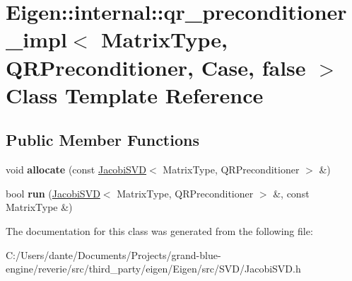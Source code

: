 \hypertarget{class_eigen_1_1internal_1_1qr__preconditioner__impl_3_01_matrix_type_00_01_q_r_preconditioner_00_01_case_00_01false_01_4}{}\section{Eigen\+::internal\+::qr\+\_\+preconditioner\+\_\+impl$<$ Matrix\+Type, Q\+R\+Preconditioner, Case, false $>$ Class Template Reference}
\label{class_eigen_1_1internal_1_1qr__preconditioner__impl_3_01_matrix_type_00_01_q_r_preconditioner_00_01_case_00_01false_01_4}
\subsection*{Public Member Functions}
\begin{DoxyCompactItemize}
\item 
\mbox{\label{class_eigen_1_1internal_1_1qr__preconditioner__impl_3_01_matrix_type_00_01_q_r_preconditioner_00_01_case_00_01false_01_4_a01b0ec87576066bf204beaadddf9a8a0}} 
void {\bfseries allocate} (const \mbox{\hyperlink{class_eigen_1_1_jacobi_s_v_d}{Jacobi\+S\+VD}}$<$ Matrix\+Type, Q\+R\+Preconditioner $>$ \&)
\item 
\mbox{\label{class_eigen_1_1internal_1_1qr__preconditioner__impl_3_01_matrix_type_00_01_q_r_preconditioner_00_01_case_00_01false_01_4_abeec41257bdf659db9940e51544c4073}} 
bool {\bfseries run} (\mbox{\hyperlink{class_eigen_1_1_jacobi_s_v_d}{Jacobi\+S\+VD}}$<$ Matrix\+Type, Q\+R\+Preconditioner $>$ \&, const Matrix\+Type \&)
\end{DoxyCompactItemize}


The documentation for this class was generated from the following file\+:\begin{DoxyCompactItemize}
\item 
C\+:/\+Users/dante/\+Documents/\+Projects/grand-\/blue-\/engine/reverie/src/third\+\_\+party/eigen/\+Eigen/src/\+S\+V\+D/Jacobi\+S\+V\+D.\+h\end{DoxyCompactItemize}
